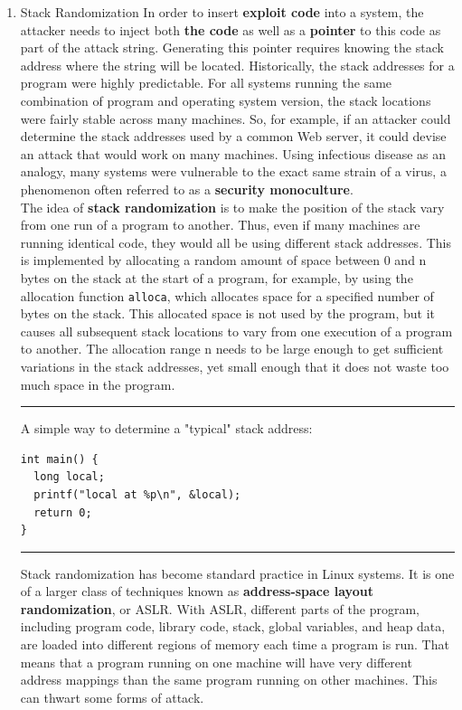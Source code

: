 \documentclass[11pt]{article}
\begin{document}
\begin{enumerate}
\item Stack Randomization
\label{sec:orgac1215e}
In order to insert \textbf{exploit code} into a system, the attacker needs to inject both \textbf{the code} as well as a \textbf{pointer} to this code as part of the attack string. Generating this pointer requires knowing the stack address where the string will be located. Historically, the stack addresses for a program were highly predictable. For all systems running the same combination of program and operating system version, the stack locations were fairly stable across many machines. So, for example, if an attacker could determine the stack addresses used by a common Web server, it could devise an attack that would work on many machines. Using infectious disease as an analogy, many systems were vulnerable to the exact same strain of a virus, a phenomenon often referred to as a \textbf{security monoculture}.\\

The idea of \textbf{stack randomization} is to make the position of the stack vary from one run of a program to another. Thus, even if many machines are running identical code, they would all be using different stack addresses. This is implemented by allocating a random amount of space between 0 and n bytes on the stack at the start of a program, for example, by using the allocation function \texttt{alloca}, which allocates space for a specified number of bytes on the stack. This allocated space is not used by the program, but it causes all subsequent stack locations to vary from one execution of a program to another. The allocation range n needs to be large enough to get sufficient variations in the stack addresses, yet small enough that it does not waste too much space in the program.\\


\noindent\rule{\textwidth}{0.5pt}
A simple way to determine a "typical" stack address:\\
\begin{verbatim}
int main() {
  long local;
  printf("local at %p\n", &local);
  return 0;
}
\end{verbatim}

\noindent\rule{\textwidth}{0.5pt}

Stack randomization has become standard practice in Linux systems. It is one of a larger class of techniques known as \textbf{address-space layout randomization}, or ASLR. With ASLR, different parts of the program, including program code, library code, stack, global variables, and heap data, are loaded into different regions of memory each time a program is run. That means that a program running on one machine will have very different address mappings than the same program running on other machines. This can thwart some forms of attack.\\



\end{enumerate}
\end{document}
